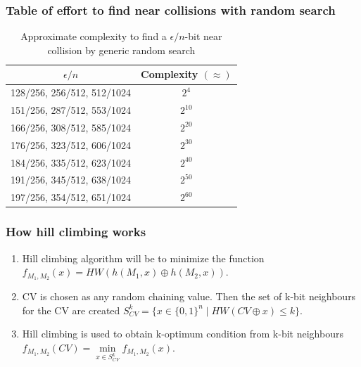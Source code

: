 \documentclass{beamer}
\begin{document}
\begin{frame}
\frametitle{Table of effort to find near collisions with random search}
\begin{table}
  \begin{center}
    \begin{tabular}{ | c | c | } \hline
      $\epsilon / n $            & Complexity $( \approx )$ \\ \hline
      128/256, 256/512, 512/1024 & $2^{4}$ \\ \hline
      151/256, 287/512, 553/1024 & $2^{10}$ \\ \hline
      166/256, 308/512, 585/1024 & $2^{20}$ \\ \hline
      176/256, 323/512, 606/1024 & $2^{30}$ \\ \hline
      184/256, 335/512, 623/1024 & $2^{40}$ \\ \hline
      191/256, 345/512, 638/1024 & $2^{50}$ \\ \hline
      197/256, 354/512, 651/1024 & $2^{60}$ \\ \hline
    \end{tabular}
    \caption{Approximate complexity to find a $\epsilon / n$-bit near collision by generic random search
    \footnotemark}
  \end{center}
\end{table}
\end{frame}

\begin{frame}
\frametitle{How hill climbing works}
\begin{enumerate}
\item Hill climbing algorithm will be to minimize the function 
$f_{M_{1}, M_{2}}(x) = HW( h(M_{1}, x) \oplus h(M_{2}, x) )$.
\item CV is chosen as any random chaining value. Then the set of k-bit neighbours for the CV are created
$S^{k}_{CV} = \{ x \in \{0, 1\}^{n} \mid HW( CV \oplus x ) \leq k \}$.
\item Hill climbing is used to obtain k-optimum condition from k-bit neighbours 
$f_{M_{1}, M_{2}} (CV) =  \min\limits_{x \in S^{k}_{CV}} f_{M_{1}, M_{2}} (x)$.
\end{enumerate}
\end{frame}
\end{document}
